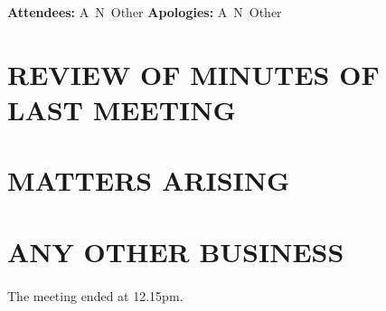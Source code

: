 \documentclass[12pt,a4paper]{article}
\begin{document}
\title{}
\author{}
\date{}
\maketitle

\begin{center}
  \textbf{Attendees:} A~N~Other 
  \textbf{Apologies:} A~N~Other \\
\end{center}

\hline

\section{REVIEW OF MINUTES OF LAST MEETING}

\section{MATTERS ARISING}

\section{ANY OTHER BUSINESS}

\paragraph{}
The meeting ended at 12.15pm.
\end{document}
